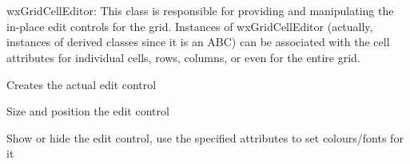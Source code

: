 %
%


\section{}\label{wxgridcelleditor}



wxGridCellEditor:  This class is responsible for providing and manipulating
the in-place edit controls for the grid.  Instances of wxGridCellEditor
(actually, instances of derived classes since it is an ABC) can be
associated with the cell attributes for individual cells, rows, columns, or
even for the entire grid.







\label{wxgridcelleditorwxgridcelleditor}



\label{wxgridcelleditoriscreated}



\label{wxgridcelleditorcreate}


Creates the actual edit control


\label{wxgridcelleditorsetsize}


Size and position the edit control


\label{wxgridcelleditorshow}


Show or hide the edit control, use the specified attributes to set
colours/fonts for it


\label{wxgridcelleditorpaintbackground}



